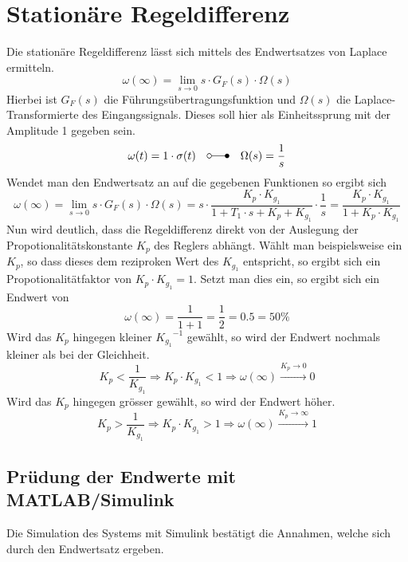 \section{Stationäre Regeldifferenz}
Die stationäre Regeldifferenz lässt sich mittels des Endwertsatzes von
Laplace ermitteln.
\[
	\omega(\infty)
	= \lim_{s \rightarrow 0} s \cdot G_F(s) \cdot \Omega(s)	
\]
Hierbei ist $G_F(s)$ die Führungsübertragungsfunktion und $\Omega(s)$ die
Laplace-Transformierte des Eingangssignals. Dieses soll hier als
Einheitssprung mit der Amplitude 1 gegeben sein.
\[
	\omega(t)
	= 1 \cdot \sigma(t) \quad \laplace \quad \Omega(s) = \frac{1}{s}
\]
Wendet man den Endwertsatz an auf die gegebenen Funktionen so ergibt sich
\[
	\omega(\infty)
	= \lim_{s \rightarrow 0} s \cdot G_F(s) \cdot \Omega(s)	
	= s \cdot \frac{
		K_p \cdot K_{g_1}
	}{
		1 + T_1 \cdot s + K_p + K_{g_1}
	} \cdot \frac{1}{s}
	= \frac{K_p \cdot K_{g_1}}{1 + K_p \cdot K_{g_1}}
\]
Nun wird deutlich, dass die Regeldifferenz direkt von der Auslegung der
Propotionalitätskonstante $K_p$ des Reglers abhängt. Wählt man beispielsweise
ein $K_p$, so dass dieses dem reziproken Wert des $K_{g_1}$ entspricht, so
ergibt sich ein Propotionalitätfaktor von $K_p \cdot K_{g_1} = 1$. Setzt man
dies ein, so ergibt sich ein Endwert von 
\[
	\omega(\infty) = \frac{1}{1+1} = \frac{1}{2} = 0.5 = 50\%	
\]
Wird das $K_p$ hingegen kleiner ${K_{g_1}}^{-1}$ gewählt, so wird der Endwert
nochmals kleiner als bei der Gleichheit.
\[
	K_p < \frac{1}{K_{g_1}}
	\Rightarrow K_p \cdot K_{g_1} < 1 
		\Rightarrow \omega(\infty) \xrightarrow{K_p \rightarrow 0} 0
\]
Wird das $K_p$ hingegen grösser gewählt, so wird der Endwert höher.
\[
	K_p > \frac{1}{K_{g_1}}
	\Rightarrow K_p \cdot K_{g_1} > 1
		\Rightarrow \omega(\infty) \xrightarrow{K_p \rightarrow \infty} 1
\]

\subsection{Prüdung der Endwerte mit MATLAB/Simulink}
Die Simulation des Systems mit Simulink bestätigt die Annahmen, welche sich
durch den Endwertsatz ergeben.
